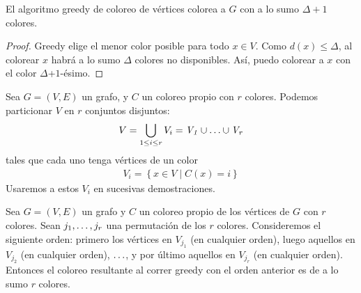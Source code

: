 \begin{proposition}
  El algoritmo greedy de coloreo de vértices colorea a $G$ con a lo sumo $\Delta + 1$ colores.
\end{proposition}

\begin{proof}
  Greedy elige el menor color posible para todo $x\in V$.
  Como $d(x) \le \Delta$, al colorear $x$ habrá  a lo sumo $\Delta$ colores no disponibles. Así, puedo colorear a $x$ con el color $\Delta$+$1$-ésimo.
\end{proof}

\begin{definition}
  Sea $G = (V, E)$ un grafo, y  $C$ un coloreo propio con $r$ colores. Podemos particionar $V$ en $r$ conjuntos disjuntos:
  \begin{align}
    V = \bigcup_{1\le i \le r} V_i = \mathit{V_1} \cup \mathellipsis \cup \mathit{V_r}
  \end{align}  
  tales que cada uno tenga vértices de un color
  \begin{align}
    \mathit{V_i} = \left\{x \in V \mid C(x) = i\right\}
  \end{align}
  Usaremos a estos $V_i$ en sucesivas demostraciones.
\end{definition}

\begin{theorem}
  Sea $G = (V, E)$ un grafo y $C$ un coloreo propio de los vértices de $G$ con $r$ colores. Sean $j_1, \mathellipsis, j_r$ una permutación de los $r$ colores. Consideremos el siguiente orden: primero los vértices en $V_{j_1}$ (en cualquier orden), luego aquellos en $V_{j_2}$ (en cualquier orden), $\mathellipsis$, y por último aquellos en $V_{j_r}$ (en cualquier orden). Entonces el coloreo resultante al correr greedy con el orden anterior es de a lo sumo $r$ colores.
\end{theorem}

